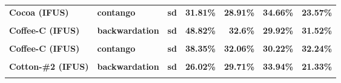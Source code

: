 \documentclass[
  authoryear,
  preprint,
  3p]{elsarticle}
\begin{document}
\begin{longtable}[t]{>{}l>{}l>{}l>{}r>{}r>{}r>{}r}
\textbf{Cocoa (IFUS)} & \textbf{contango} & \textbf{sd} & \textcolor[HTML]{4285f4}{\textbf{31.81\%}} & \textcolor[HTML]{4285f4}{\textbf{28.91\%}} & \textcolor[HTML]{4285f4}{\textbf{34.66\%}} & \textcolor[HTML]{4285f4}{\textbf{23.57\%}}\\
\addlinespace
\textbf{\cellcolor{gray!10}{Coffee-C (IFUS)}} & \textbf{\cellcolor{gray!10}{backwardation}} & \textbf{\cellcolor{gray!10}{mean}} & \textcolor[HTML]{4285f4}{\textbf{\cellcolor{gray!10}{4.51\%}}} & \textcolor[HTML]{4285f4}{\textbf{\cellcolor{gray!10}{26.49\%}}} & \textcolor[HTML]{4285f4}{\textbf{\cellcolor{gray!10}{2.66\%}}} & \textcolor[HTML]{4285f4}{\textbf{\cellcolor{gray!10}{14.36\%}}}\\
\textbf{Coffee-C (IFUS)} & \textbf{backwardation} & \textbf{sd} & \textcolor[HTML]{4285f4}{\textbf{48.82\%}} & \textcolor[HTML]{4285f4}{\textbf{32.6\%}} & \textcolor[HTML]{4285f4}{\textbf{29.92\%}} & \textcolor[HTML]{4285f4}{\textbf{31.52\%}}\\
\textbf{\cellcolor{gray!10}{Coffee-C (IFUS)}} & \textbf{\cellcolor{gray!10}{contango}} & \textbf{\cellcolor{gray!10}{mean}} & \textcolor[HTML]{4285f4}{\textbf{\cellcolor{gray!10}{-16.87\%}}} & \textcolor[HTML]{4285f4}{\textbf{\cellcolor{gray!10}{14.38\%}}} & \textcolor[HTML]{4285f4}{\textbf{\cellcolor{gray!10}{3.4\%}}} & \textcolor[HTML]{4285f4}{\textbf{\cellcolor{gray!10}{-10.24\%}}}\\
\textbf{Coffee-C (IFUS)} & \textbf{contango} & \textbf{sd} & \textcolor[HTML]{4285f4}{\textbf{38.35\%}} & \textcolor[HTML]{4285f4}{\textbf{32.06\%}} & \textcolor[HTML]{4285f4}{\textbf{30.22\%}} & \textcolor[HTML]{4285f4}{\textbf{32.24\%}}\\
\textbf{\cellcolor{gray!10}{Cotton-\#2 (IFUS)}} & \textbf{\cellcolor{gray!10}{backwardation}} & \textbf{\cellcolor{gray!10}{mean}} & \textcolor[HTML]{4285f4}{\textbf{\cellcolor{gray!10}{22.64\%}}} & \textcolor[HTML]{4285f4}{\textbf{\cellcolor{gray!10}{7.85\%}}} & \textcolor[HTML]{4285f4}{\textbf{\cellcolor{gray!10}{35.53\%}}} & \textcolor[HTML]{4285f4}{\textbf{\cellcolor{gray!10}{10.84\%}}}\\
\addlinespace
\textbf{Cotton-\#2 (IFUS)} & \textbf{backwardation} & \textbf{sd} & \textcolor[HTML]{4285f4}{\textbf{26.02\%}} & \textcolor[HTML]{4285f4}{\textbf{29.71\%}} & \textcolor[HTML]{4285f4}{\textbf{33.94\%}} & \textcolor[HTML]{4285f4}{\textbf{21.33\%}}\\
\textbf{\cellcolor{gray!10}{Cotton-\#2 (IFUS)}} & \textbf{\cellcolor{gray!10}{contango}} & \textbf{\cellcolor{gray!10}{mean}} & \textcolor[HTML]{4285f4}{\textbf{\cellcolor{gray!10}{-16.46\%}}} & \textcolor[HTML]{4285f4}{\textbf{\cellcolor{gray!10}{-5.92\%}}} & \textcolor[HTML]{4285f4}{\textbf{\cellcolor{gray!10}{-9.36\%}}} & \textcolor[HTML]{4285f4}{\textbf{\cellcolor{gray!10}{-8.91\%}}}\\

\end{longtable}
\end{document}

